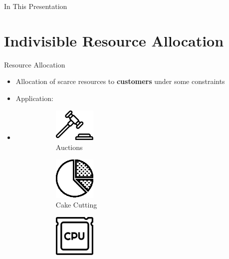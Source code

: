 
\begin{frame}[t,plain]
\titlepage
\end{frame}


\begin{frame}{In This Presentation}
  \tableofcontents
\end{frame}

\section{Indivisible Resource Allocation}
\frame{\textbf{\insertsection}}


\begin{frame}[t]{Resource Allocation}
    \begin{itemize}
        \item<2-> Allocation of scarce resources to \textbf{customers} under some constraints
        \item<3-> Application:
        \item<4->[ ]
        \begin{figure}
            \begin{subfigure}[b]{0.45\textwidth}  
                \centering
                \includegraphics[width=2cm]{auction.eps}
                \caption*{Auctions}
                \label{fig:my_label}
            \end{subfigure}
            \begin{subfigure}[b]{0.45\textwidth}    
                \centering
                \includegraphics[width=2cm]{pie-chart.eps}
                \caption*{Cake Cutting}
                \label{fig:my_label}
            \end{subfigure}
            \begin{subfigure}[b]{0.45\textwidth}     
                \centering
                \includegraphics[width=2cm]{cpu.eps}

\end{subfigure}
\end{figure}
\end{itemize}
\end{frame}
